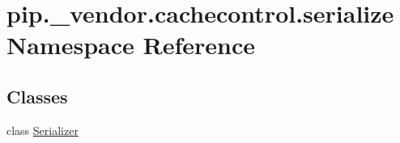 \hypertarget{namespacepip_1_1__vendor_1_1cachecontrol_1_1serialize}{}\section{pip.\+\_\+vendor.\+cachecontrol.\+serialize Namespace Reference}
\label{namespacepip_1_1__vendor_1_1cachecontrol_1_1serialize}
\subsection*{Classes}
\begin{DoxyCompactItemize}
\item 
class \hyperlink{classpip_1_1__vendor_1_1cachecontrol_1_1serialize_1_1Serializer}{Serializer}
\end{DoxyCompactItemize}
